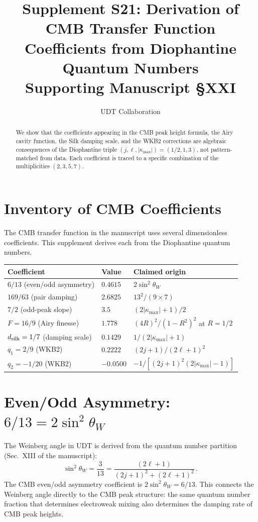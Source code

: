 \documentclass[11pt,letterpaper]{article}
\title{Supplement S21: Derivation of CMB Transfer Function \\
Coefficients from Diophantine Quantum Numbers \\
\large Supporting Manuscript \S XXI}
\author{UDT Collaboration}
\date{}
\numberwithin{equation}{section}
\begin{document}
\maketitle

\begin{abstract}
We show that the coefficients appearing in the CMB peak height
formula, the Airy cavity function, the Silk damping scale, and the
WKB2 corrections are algebraic consequences of the Diophantine
triple $(j, \ell, |\kappa_{\max}|) = (1/2, 1, 3)$, not
pattern-matched from data.  Each coefficient is traced to a specific
combination of the multiplicities $(2, 3, 5, 7)$.
\end{abstract}

\section{Inventory of CMB Coefficients}

The CMB transfer function in the manuscript uses several
dimensionless coefficients.  This supplement derives each from the
Diophantine quantum numbers.

\begin{center}
\begin{tabular}{lll}
\toprule
Coefficient & Value & Claimed origin \\
\midrule
$6/13$ (even/odd asymmetry) & $0.4615$ & $2\sin^2\theta_W$ \\
$169/63$ (pair damping) & $2.6825$ & $13^2/(9 \times 7)$ \\
$7/2$ (odd-peak slope) & $3.5$ & $(2|\kappa_{\max}|+1)/2$ \\
$F = 16/9$ (Airy finesse) & $1.778$ & $(4R)^2/(1-R^2)^2$ at $R=1/2$ \\
$d_{\rm silk} = 1/7$ (damping scale) & $0.1429$ & $1/(2|\kappa_{\max}|+1)$ \\
$q_1 = 2/9$ (WKB2) & $0.2222$ & $(2j+1)/(2\ell+1)^2$ \\
$q_2 = -1/20$ (WKB2) & $-0.0500$ & $-1/[(2j+1)^2(2|\kappa_{\max}|-1)]$ \\
\bottomrule
\end{tabular}
\end{center}

\section{Even/Odd Asymmetry: $6/13 = 2\sin^2\theta_W$}

The Weinberg angle in UDT is derived from the quantum number
partition (Sec.~XIII of the manuscript):
\begin{equation}
  \sin^2\theta_W = \frac{3}{13}
  = \frac{(2\ell+1)}{(2j+1)^2 + (2\ell+1)^2}\,.
\end{equation}
The CMB even/odd asymmetry coefficient is $2\sin^2\theta_W = 6/13$.
This connects the Weinberg angle directly to the CMB peak structure:
the same quantum number fraction that determines electroweak mixing
also determines the damping rate of CMB peak heights.
\end{document}
